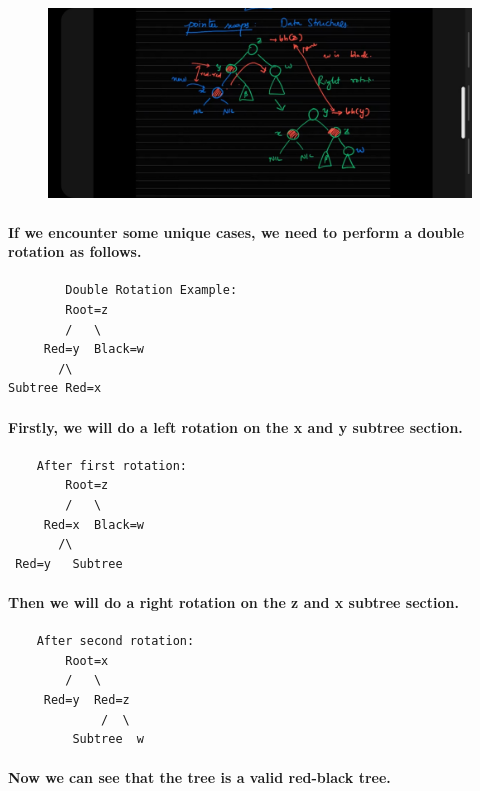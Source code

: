 \documentclass{article}
\begin{document}
\begin{figure}[H]
    \includegraphics[width=\textwidth]{afterrightrotation.jpg}
\end{figure}

\paragraph{
    If we encounter some unique cases, we need to perform a double rotation as follows.\\
}

\begin{verbatim}
        Double Rotation Example:
        Root=z
        /   \
     Red=y  Black=w
       /\
Subtree Red=x   
\end{verbatim}

\paragraph{
    Firstly, we will do a left rotation on the x and y subtree section.\\
}

\begin{verbatim}
    After first rotation:
        Root=z
        /   \
     Red=x  Black=w
       /\
 Red=y   Subtree
\end{verbatim}

\paragraph{
    Then we will do a right rotation on the z and x subtree section.\\
}

\begin{verbatim}
    After second rotation:
        Root=x
        /   \
     Red=y  Red=z
             /  \ 
         Subtree  w
\end{verbatim}

\paragraph{
    Now we can see that the tree is a valid red-black tree.\\
}
\end{document}
